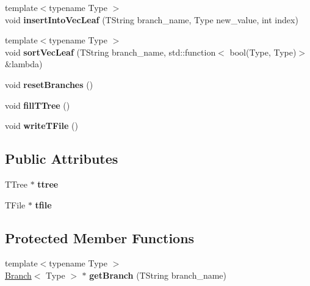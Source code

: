 \begin{DoxyCompactItemize}
\item 
{\footnotesize template$<$typename Type $>$ }\\void {\bfseries insert\+Into\+Vec\+Leaf} (T\+String branch\+\_\+name, Type new\+\_\+value, int index)\hypertarget{classArbol_a7ac9c4d6404c79519d277975a8566e60}{}\label{classArbol_a7ac9c4d6404c79519d277975a8566e60}

\item 
{\footnotesize template$<$typename Type $>$ }\\void {\bfseries sort\+Vec\+Leaf} (T\+String branch\+\_\+name, std\+::function$<$ bool(Type, Type)$>$ \&lambda)\hypertarget{classArbol_aa4066700ccb5ecc42477538734ae6abb}{}\label{classArbol_aa4066700ccb5ecc42477538734ae6abb}

\item 
void {\bfseries reset\+Branches} ()\hypertarget{classArbol_a4c2184d378ab21a9627a57098291a7c4}{}\label{classArbol_a4c2184d378ab21a9627a57098291a7c4}

\item 
void {\bfseries fill\+T\+Tree} ()\hypertarget{classArbol_a1d029dd97a0451281c774b578d93bcda}{}\label{classArbol_a1d029dd97a0451281c774b578d93bcda}

\item 
void {\bfseries write\+T\+File} ()\hypertarget{classArbol_ade7d835bbe383a70006e86785ae5672c}{}\label{classArbol_ade7d835bbe383a70006e86785ae5672c}

\end{DoxyCompactItemize}
\subsection*{Public Attributes}
\begin{DoxyCompactItemize}
\item 
T\+Tree $\ast$ {\bfseries ttree}\hypertarget{classArbol_abe1c658a04d96bb5bbf6eda7e90acf38}{}\label{classArbol_abe1c658a04d96bb5bbf6eda7e90acf38}

\item 
T\+File $\ast$ {\bfseries tfile}\hypertarget{classArbol_ae2b0964ee5e90cb2d7beb10810c14b9c}{}\label{classArbol_ae2b0964ee5e90cb2d7beb10810c14b9c}

\end{DoxyCompactItemize}
\subsection*{Protected Member Functions}
\begin{DoxyCompactItemize}
\item 
{\footnotesize template$<$typename Type $>$ }\\\hyperlink{classBranch}{Branch}$<$ Type $>$ $\ast$ {\bfseries get\+Branch} (T\+String branch\+\_\+name)\hypertarget{classArbol_af741f05e40b0972472057ddcf56aac1c}{}\label{classArbol_af741f05e40b0972472057ddcf56aac1c}

\end{DoxyCompactItemize}
